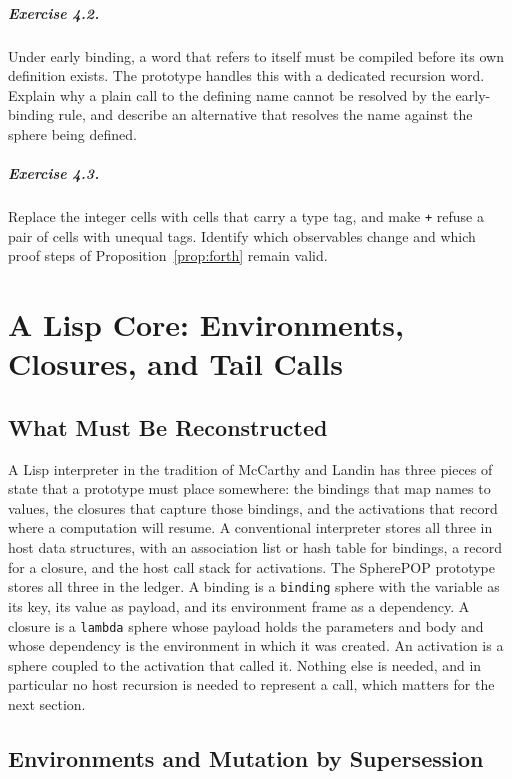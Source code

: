 \documentclass[11pt,oneside]{report}
\newcommand{\SP}{SpherePOP}
\theoremstyle{plain}
\theoremstyle{definition}
\theoremstyle{remark}
\begin{document}
\paragraph{Exercise 4.2.} Under early binding, a word that refers to itself must be compiled before its own definition exists. The prototype handles this with a dedicated recursion word. Explain why a plain call to the defining name cannot be resolved by the early-binding rule, and describe an alternative that resolves the name against the sphere being defined.

\paragraph{Exercise 4.3.} Replace the integer cells with cells that carry a type tag, and make \texttt{+} refuse a pair of cells with unequal tags. Identify which observables change and which proof steps of Proposition~\ref{prop:forth} remain valid.

\chapter{A Lisp Core: Environments, Closures, and Tail Calls}

\section{What Must Be Reconstructed}

A Lisp interpreter in the tradition of McCarthy and Landin \cite{mccarthy60,landin64,sicp} has three pieces of state that a prototype must place somewhere: the bindings that map names to values, the closures that capture those bindings, and the activations that record where a computation will resume. A conventional interpreter stores all three in host data structures, with an association list or hash table for bindings, a record for a closure, and the host call stack for activations. The \SP{} prototype stores all three in the ledger. A binding is a \texttt{binding} sphere with the variable as its key, its value as payload, and its environment frame as a dependency. A closure is a \texttt{lambda} sphere whose payload holds the parameters and body and whose dependency is the environment in which it was created. An activation is a sphere coupled to the activation that called it. Nothing else is needed, and in particular no host recursion is needed to represent a call, which matters for the next section.

\section{Environments and Mutation by Supersession}
\end{document}
